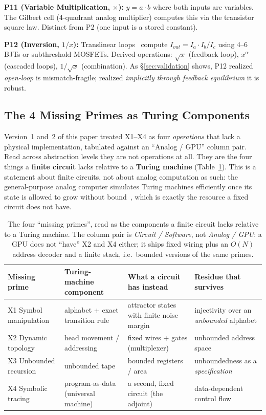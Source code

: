 \documentclass[11pt]{article}
\begin{document}
\textbf{P11 (Variable Multiplication, $\times$):} $y = a \cdot b$ where both inputs are variables. The Gilbert cell (4-quadrant analog multiplier) computes this via the transistor square law. Distinct from P2 (one input is a stored constant).

\textbf{P12 (Inversion, $1/x$):} Translinear loops~\cite{gilbert1975} compute $I_{out} = I_a \cdot I_b / I_c$ using 4--6 BJTs or subthreshold MOSFETs. Derived operations: $\sqrt{x}$ (feedback loop), $x^\alpha$ (cascaded loops), $1/\sqrt{x}$ (combination). As \S\ref{sec:validation} shows, P12 realized \textit{open-loop} is mismatch-fragile; realized \textit{implicitly through feedback equilibrium} it is robust.

\subsection{The 4 Missing Primes as Turing Components}
\label{sec:missing}

Version~1 and~2 of this paper treated X1--X4 as four \textit{operations} that lack a physical implementation, tabulated against an ``Analog / GPU'' column pair. Read across abstraction levels they are not operations at all. They are the four things a \textbf{finite circuit} lacks relative to a \textbf{Turing machine} (Table~\ref{tab:missing}). This is a statement about finite circuits, not about analog computation as such: the general-purpose analog computer simulates Turing machines efficiently once its state is allowed to grow without bound~\cite{pouly2013}, which is exactly the resource a fixed circuit does not have.

\begin{table}[h]
\centering
\caption{The four ``missing primes'', read as the components a finite circuit lacks relative to a Turing machine. The column pair is \textit{Circuit / Software}, not \textit{Analog / GPU}: a GPU does not ``have'' X2 and X4 either; it ships fixed wiring plus an $O(N)$ address decoder and a finite stack, i.e.\ bounded versions of the same primes.}
\label{tab:missing}
\footnotesize
\begin{tabular}{p{2.3cm}p{4.2cm}p{4.4cm}p{3.1cm}}
\toprule
Missing prime & Turing-machine component & What a circuit has instead & Residue that survives \\
\midrule
X1 Symbol manipulation & alphabet + exact transition rule & attractor states with finite noise margin & injectivity over an \textit{unbounded} alphabet \\
X2 Dynamic topology & head movement / addressing & fixed wires + gates (multiplexer) & unbounded address space \\
X3 Unbounded recursion & unbounded tape & bounded registers / area & unboundedness as a \textit{specification} \\
X4 Symbolic tracing & program-as-data (universal machine) & a second, fixed circuit (the adjoint) & data-dependent control flow \\
\bottomrule
\end{tabular}
\end{table}
\end{document}
